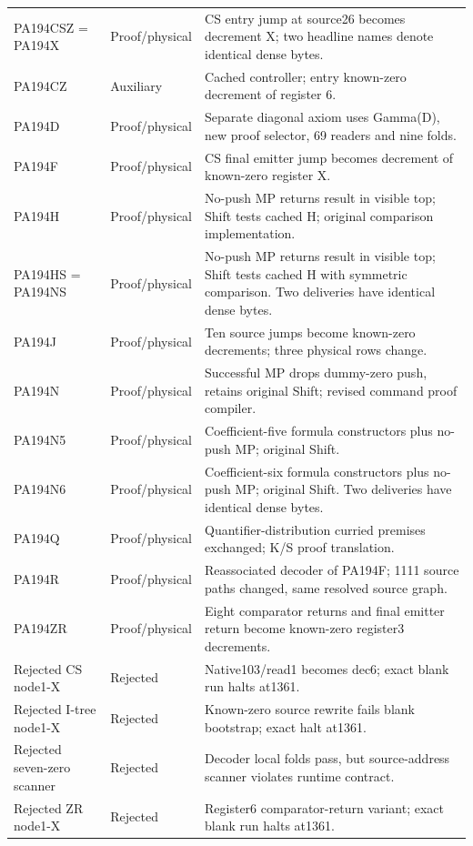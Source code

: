 {\begin{longtable}{p{}p{}p{}}
PA194CSZ = PA194X & Proof/physical & CS entry jump at source26 becomes decrement X; two headline names denote identical dense bytes.\\[5pt]
PA194CZ & Auxiliary & Cached controller; entry known-zero decrement of register 6.\\[5pt]
PA194D & Proof/physical & Separate diagonal axiom uses Gamma(D), new proof selector, 69 readers and nine folds.\\[5pt]
PA194F & Proof/physical & CS final emitter jump becomes decrement of known-zero register X.\\[5pt]
PA194H & Proof/physical & No-push MP returns result in visible top; Shift tests cached H; original comparison implementation.\\[5pt]
PA194HS = PA194NS & Proof/physical & No-push MP returns result in visible top; Shift tests cached H with symmetric comparison. Two deliveries have identical dense bytes.\\[5pt]
PA194J & Proof/physical & Ten source jumps become known-zero decrements; three physical rows change.\\[5pt]
PA194N & Proof/physical & Successful MP drops dummy-zero push, retains original Shift; revised command proof compiler.\\[5pt]
PA194N5 & Proof/physical & Coefficient-five formula constructors plus no-push MP; original Shift.\\[5pt]
PA194N6 & Proof/physical & Coefficient-six formula constructors plus no-push MP; original Shift. Two deliveries have identical dense bytes.\\[5pt]
PA194Q & Proof/physical & Quantifier-distribution curried premises exchanged; K/S proof translation.\\[5pt]
PA194R & Proof/physical & Reassociated decoder of PA194F; 1111 source paths changed, same resolved source graph.\\[5pt]
PA194ZR & Proof/physical & Eight comparator returns and final emitter return become known-zero register3 decrements.\\[5pt]
Rejected CS node1-X & Rejected & Native103/read1 becomes dec6; exact blank run halts at1361.\\[5pt]
Rejected I-tree node1-X & Rejected & Known-zero source rewrite fails blank bootstrap; exact halt at1361.\\[5pt]
Rejected seven-zero scanner & Rejected & Decoder local folds pass, but source-address scanner violates runtime contract.\\[5pt]
Rejected ZR node1-X & Rejected & Register6 comparator-return variant; exact blank run halts at1361.\\[5pt]
\bottomrule\end{longtable}}
